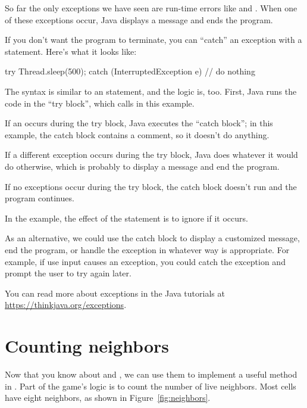 So far the only exceptions we have seen are run-time errors like  and .
When one of these exceptions occur, Java displays a message and ends the program.

If you don't want the program to terminate, you can ``catch'' an exception with a  statement.  Here's what it looks like:


\begin{code}
    try {
        Thread.sleep(500);
    } catch (InterruptedException e) {
        // do nothing
    }
\end{code}

The syntax is similar to an  statement, and the logic is, too.
First, Java runs the code in the ``try block'', which calls  in this example.

If an  occurs during the try block, Java executes the ``catch block''; in this example, the catch block contains a comment, so it doesn't do anything.

If a different exception occurs during the try block, Java does whatever it would do otherwise, which is probably to display a message and end the program.

If no exceptions occur during the try block, the catch block doesn't run and the program continues.

In the example, the effect of the  statement is to ignore   if it occurs.

As an alternative, we could use the catch block to display a customized message, end the program, or handle the exception in whatever way is appropriate.
For example, if use input causes an exception, you could catch the exception and prompt the user to try again later.

You can read more about exceptions in the Java tutorials at \url{https://thinkjava.org/exceptions}.


\section{Counting neighbors}


Now that you know about  and , we can use them to implement a useful method in .
Part of the game's logic is to count the number of live neighbors.
Most cells have eight neighbors, as shown in Figure~\ref{fig:neighbors}.

